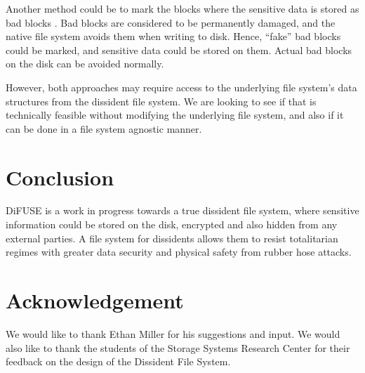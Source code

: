 \documentclass[10pt,twocolumn]{article}
\begin{document}
Another method could be to mark the blocks where the sensitive data is stored as bad blocks \cite{badblocks}. Bad blocks are considered to be permanently damaged, and the native file system avoids them when writing to disk. Hence, ``fake'' bad blocks could be marked, and sensitive data could be stored on them. Actual bad blocks on the disk can be avoided normally.

However, both approaches may require access to the underlying file system's data structures from the dissident file system. We are looking to see if that is technically feasible without modifying the underlying file system, and also if it can be done in a file system agnostic manner.

\section{Conclusion}

DiFUSE is a work in progress towards a true dissident file system, where sensitive information could be stored on the disk, encrypted and also hidden from any external parties. A file system for dissidents allows them to resist totalitarian regimes with greater data security and physical safety from rubber hose attacks.


\section*{Acknowledgement}

We would like to thank Ethan Miller for his suggestions and input. We would also like to thank the students of the Storage Systems Research Center for their feedback on the design of the Dissident File System.



\end{document}
